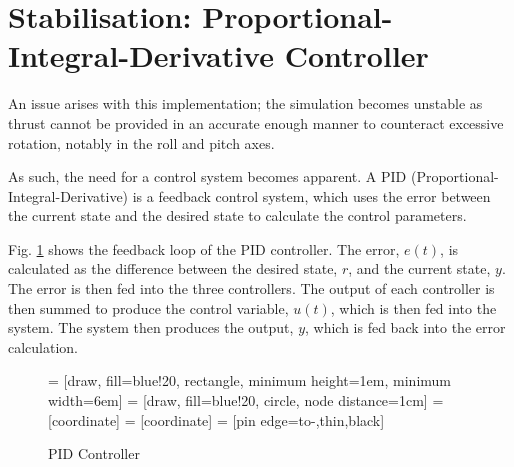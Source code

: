\documentclass{article}
\begin{document}
\section{Stabilisation: Proportional-Integral-Derivative Controller}

An issue arises with this implementation; the simulation becomes unstable as thrust cannot be provided in an accurate enough manner to counteract excessive rotation, notably in the roll and pitch axes. 

As such, the need for a control system becomes apparent. A PID (Proportional-Integral-Derivative) is a feedback control system, which uses the error between the current state and the desired state to calculate the control parameters.

Fig. \ref{fig:pid} shows the feedback loop of the PID controller. The error, $e(t)$, is calculated as the difference between the desired state, $r$, and the current state, $y$. The error is then fed into the three controllers. The output of each controller is then summed to produce the control variable, $u(t)$, which is then fed into the system. The system then produces the output, $y$, which is fed back into the error calculation.

\begin{figure}[H]
    \centering
     = [draw, fill=blue!20, rectangle, 
    minimum height=1em, minimum width=6em]
     = [draw, fill=blue!20, circle, node distance=1cm]
     = [coordinate]
     = [coordinate]
     = [pin edge={to-,thin,black}]

    \caption{PID Controller}
    \label{fig:pid}
\end{figure}
\end{document}
